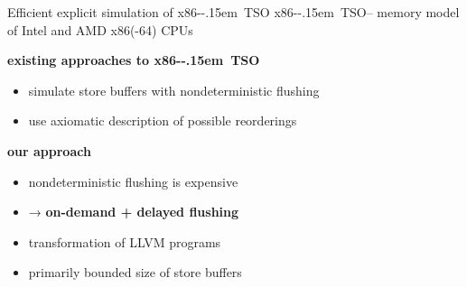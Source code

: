 \documentclass[aspectratio=169, fi]{paradise-slide}
\newcommand{\xtso}{\mbox{x86-\kern-.15em TSO}\xspace}
\begin{document}
\begin{frame}[fragile]{Efficient explicit simulation of \xtso}
  \xtso – memory model of Intel and AMD x86(-64) CPUs
  \bigskip

  \textbf{existing approaches to \xtso}
  \begin{itemize}
    \item simulate store buffers with nondeterministic flushing
    \item use axiomatic description of possible reorderings
  \end{itemize}
  \pause

  \bigskip
  \textbf{our approach}
  \begin{itemize}
    \item nondeterministic flushing is expensive
    \item → \textbf{on-demand + delayed flushing}
    \bigskip
    \item transformation of LLVM programs
    \item primarily bounded size of store buffers
  \end{itemize}
\end{frame}
\end{document}
